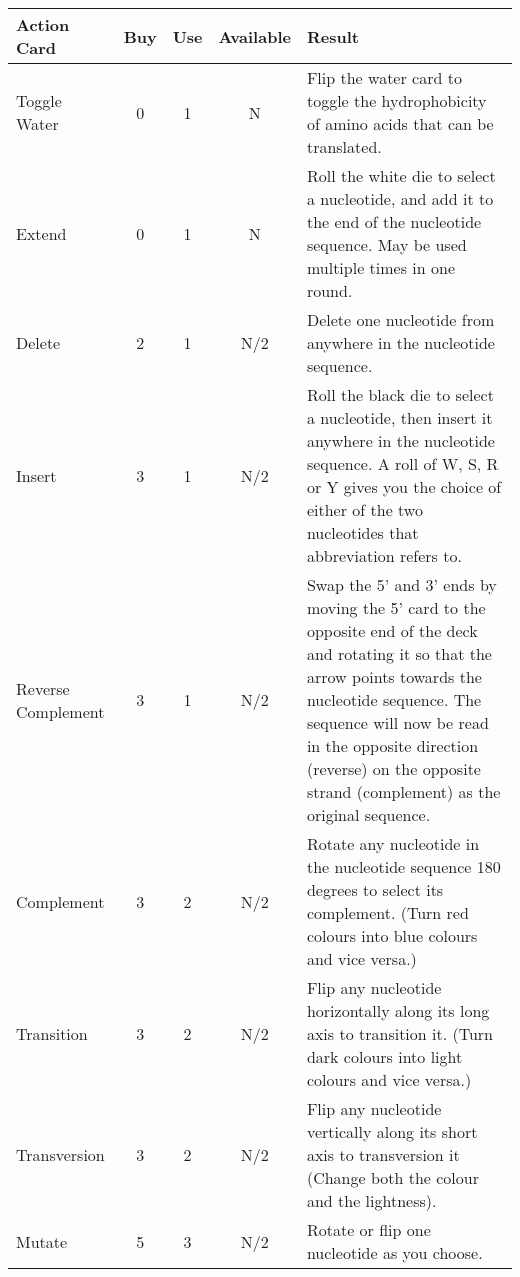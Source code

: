\documentclass[a4paper,11pt,oneside]{memoir}
\begin{document}
\begin{table}[h!]
\begin{tabular}{lcccp{10cm}}
\hline
\textbf{Action Card} & \textbf{Buy} & \textbf{Use} & \textbf{Available} & \textbf{Result} \\
\hline
    Toggle Water                 & 0 & 1 & N & Flip the water card to toggle the hydrophobicity of amino acids that can be translated. \\
    Extend                       & 0 & 1 & N & Roll the white die to select a nucleotide, and add it to the end of the nucleotide sequence. May be used multiple times in one round.\\
    Delete                       & 2 & 1 & N/2 & Delete one nucleotide from anywhere in the nucleotide sequence. \\
    Insert                       & 3 & 1 & N/2 & Roll the black die to select a nucleotide, then insert it anywhere in the nucleotide sequence.  A roll of W, S, R or Y gives you the choice of either of the two nucleotides that abbreviation refers to.\\
    Reverse Complement           & 3 & 1 & N/2 & Swap the 5' and 3' ends by moving the 5' card to the opposite end of the deck and rotating it so that the arrow points towards the nucleotide sequence.  The sequence will now be read in the opposite direction (reverse) on the opposite strand (complement) as the original sequence.  \\
    Complement                   & 3 & 2 & N/2 & Rotate any nucleotide in the nucleotide sequence 180 degrees to select its complement.  (Turn red colours into blue colours and vice versa.) \\
    Transition                   & 3 & 2 & N/2 & Flip any nucleotide horizontally along its long axis to transition it. (Turn dark colours into light colours and vice versa.) \\
    Transversion                 & 3 & 2 & N/2 & Flip any nucleotide vertically along its short axis to transversion it (Change both the colour and the lightness). \\
    Mutate                       & 5 & 3 & N/2 & Rotate or flip one nucleotide as you choose. \\
\hline
\end{tabular}
\label{actiontable}
\end{table}
\end{document}
